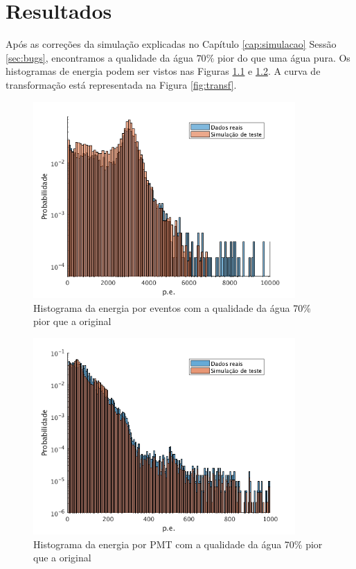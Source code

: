 \chapter{Resultados} \label{cap:resultados}
\vspace{-2cm}

Após as correções da simulação explicadas no Capítulo \ref{cap:simulacao} Sessão \ref{sec:bugs}, encontramos a qualidade da água $70\%$ pior do que uma água pura. Os histogramas de energia podem ser vistos nas Figuras \ref{fig:a5} e \ref{fig:b4}. A curva de transformação está representada na Figura \ref{fig:transf}.


\begin{figure}[H]
	\centering
	\includegraphics[width=10cm]{textuais/simulacao/figuras/hist_evt4.png}
	\caption{Histograma da energia por eventos com a qualidade da água 70\% pior que a original}
	\label{fig:a5}
\end{figure}

\begin{figure}[H]
	\centering
	\includegraphics[width=10cm]{textuais/simulacao/figuras/hist_pmt4.png}
	\caption{Histograma da energia por PMT com a qualidade da água 70\% pior que a original}
	\label{fig:b4}
\end{figure}

